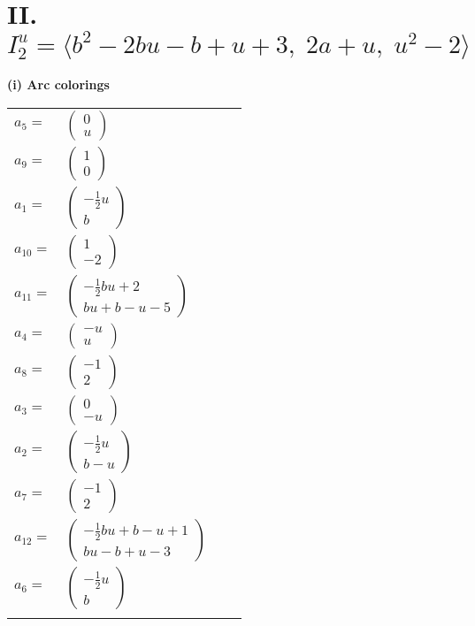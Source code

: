 \documentclass[1p]{elsarticle_modified}
\theoremstyle{definition}
\begin{document}
\centering \section*{II. $I^u_{2}= \langle b^2-2 b u- b+u+3,\;2 a+u,\;u^2-2 \rangle$}
\flushleft \textbf{(i) Arc colorings}\\
\begin{tabular}{m{7pt} m{180pt} m{7pt} m{180pt} }
\flushright $a_{5}=$&$\begin{pmatrix}0\\u\end{pmatrix}$ \\
\flushright $a_{9}=$&$\begin{pmatrix}1\\0\end{pmatrix}$ \\
\flushright $a_{1}=$&$\begin{pmatrix}-\frac{1}{2} u\\b\end{pmatrix}$ \\
\flushright $a_{10}=$&$\begin{pmatrix}1\\-2\end{pmatrix}$ \\
\flushright $a_{11}=$&$\begin{pmatrix}-\frac{1}{2} b u+2\\b u+b- u-5\end{pmatrix}$ \\
\flushright $a_{4}=$&$\begin{pmatrix}- u\\u\end{pmatrix}$ \\
\flushright $a_{8}=$&$\begin{pmatrix}-1\\2\end{pmatrix}$ \\
\flushright $a_{3}=$&$\begin{pmatrix}0\\- u\end{pmatrix}$ \\
\flushright $a_{2}=$&$\begin{pmatrix}-\frac{1}{2} u\\b- u\end{pmatrix}$ \\
\flushright $a_{7}=$&$\begin{pmatrix}-1\\2\end{pmatrix}$ \\
\flushright $a_{12}=$&$\begin{pmatrix}-\frac{1}{2} b u+b- u+1\\b u- b+u-3\end{pmatrix}$ \\
\flushright $a_{6}=$&$\begin{pmatrix}-\frac{1}{2} u\\b\end{pmatrix}$\\&\end{tabular}
\end{document}

